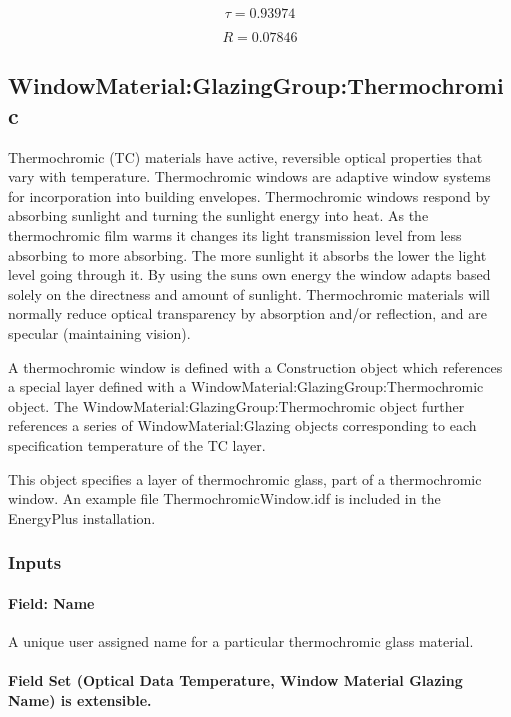\begin{equation*}
\tau = 0.93974
\end{equation*}

\begin{equation*}
R = 0.07846
\end{equation*}

\subsection{WindowMaterial:GlazingGroup:Thermochromic}\label{windowmaterialglazinggroupthermochromic}

Thermochromic (TC) materials have active, reversible optical properties that vary with temperature. Thermochromic windows are adaptive window systems for incorporation into building envelopes. Thermochromic windows respond by absorbing sunlight and turning the sunlight energy into heat. As the thermochromic film warms it changes its light transmission level from less absorbing to more absorbing. The more sunlight it absorbs the lower the light level going through it. By using the suns own energy the window adapts based solely on the directness and amount of sunlight. Thermochromic materials will normally reduce optical transparency by absorption and/or reflection, and are specular (maintaining vision).

A thermochromic window is defined with a Construction object which references a special layer defined with a WindowMaterial:GlazingGroup:Thermochromic object. The WindowMaterial:GlazingGroup:Thermochromic object further references a series of WindowMaterial:Glazing objects corresponding to each specification temperature of the TC layer.

This object specifies a layer of thermochromic glass, part of a thermochromic window. An example file ThermochromicWindow.idf is included in the EnergyPlus installation.

\subsubsection{Inputs}\label{inputs-15-015}

\paragraph{Field: Name}\label{field-name-9-017}

A unique user assigned name for a particular thermochromic glass material.

\paragraph{Field Set (Optical Data Temperature, Window Material Glazing Name) is extensible.}\label{field-set-optical-data-temperature-window-material-glazing-name-is-extensible.}

